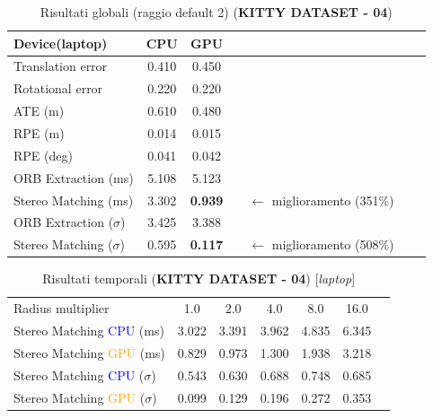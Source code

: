 \documentclass[12pt,a4paper]{report}
\begin{document}
\begin{table}[H]
    \centering
    \caption{Risultati globali (raggio default 2) (\textbf{KITTY DATASET - 04}) }
    \begin{tabular}{lcccccc}
        \toprule
        \rowcolor{gray!20}
        Device(laptop) & \cellcolor{blue!20}CPU & \cellcolor{orange!20}GPU  \\
        \midrule
        Translation error & \cellcolor{green!20}0.410 & 0.450  \\
        Rotational error  & \cellcolor{green!20}0.220 & \cellcolor{green!20}0.220  \\
        ATE (m)           & 0.610 & \cellcolor{green!20}0.480  \\
        RPE (m)           & \cellcolor{green!20}0.014 & 0.015  \\
        RPE (deg)         & \cellcolor{green!20}0.041 & 0.042  \\
        ORB Extraction (ms) & \cellcolor{green!20}5.108 & 5.123  \\
        Stereo Matching (ms) & 3.302 & \cellcolor{green!20}\textbf{0.939} && $\xleftarrow{}$ miglioramento (351\%) \\
        ORB Extraction ($\sigma$) & 3.425 & \cellcolor{green!20}3.388  \\
        Stereo Matching ($\sigma$) & 0.595 & \cellcolor{green!20}\textbf{0.117} && $\xleftarrow{}$ miglioramento (508\%)\\
        \bottomrule
    \end{tabular}
\end{table}

\begin{table}[H]
    \centering
    \caption{Risultati temporali (\textbf{KITTY DATASET - 04}) [\textit{laptop}] }
    \begin{tabular}{lcccccc}
        \toprule
        \rowcolor{gray!20}
        Radius multiplier & 1.0 & \cellcolor{orange!40}2.0 & 4.0 & 8.0 & 16.0 \\
        Stereo Matching \textcolor{blue}{CPU} (ms) & 3.022 & 3.391 & 3.962 & 4.835 & 6.345 \\
        Stereo Matching \textcolor{orange}{GPU} (ms) & 0.829 & 0.973 & 1.300 & 1.938 & 3.218 \\
        Stereo Matching \textcolor{blue}{CPU} ($\sigma$) & 0.543 & 0.630 & 0.688 & 0.748 & 0.685\\
        Stereo Matching \textcolor{orange}{GPU} ($\sigma$) & 0.099 & 0.129 & 0.196 & 0.272 & 0.353 \\
        \bottomrule
    \end{tabular}
\end{table}
\end{document}
